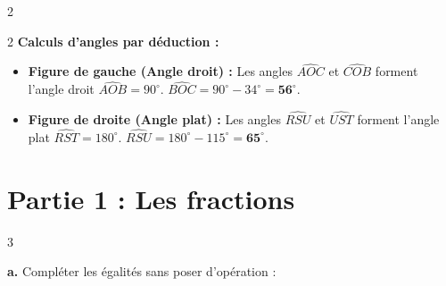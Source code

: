 \documentclass[a4paper]{book}
\begin{document}
{\begin{exerciceNote}{2}
\begin{center}
        \end{center}
    \end{exerciceNote}

        
    \begin{exerciceNote}{2}
        \textbf{Calculs d'angles par déduction :}
        \begin{itemize}
            \item \textbf{Figure de gauche (Angle droit) :} Les angles $\widehat{AOC}$ et $\widehat{COB}$ forment l'angle droit $\widehat{AOB} = 90^\circ$. \newline
            $\widehat{BOC} = 90^\circ - 34^\circ = \mathbf{56^\circ}$.
            \item \textbf{Figure de droite (Angle plat) :} Les angles $\widehat{RSU}$ et $\widehat{UST}$ forment l'angle plat $\widehat{RST} = 180^\circ$. \newline
            $\widehat{RSU} = 180^\circ - 115^\circ = \mathbf{65^\circ}$.
        \end{itemize}
    \end{exerciceNote}


\newpage
\setcounter{exo}{0}

\section*{Partie 1 : Les fractions}
    
    \begin{exerciceNote}{3}        
        \begin{minipage}[t]{0.46\textwidth}
            \textbf{a.} Compléter les égalités sans poser d'opération : \newline
            

\end{minipage}
\end{exerciceNote}}
\end{document}
